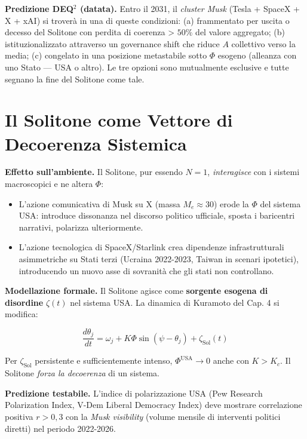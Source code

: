 \Conj{} \textbf{Predizione DEQ$^2$ (datata).} Entro il 2031, il
\emph{cluster Musk} (Tesla + SpaceX + X + xAI) si troverà in una di
queste condizioni: (a) frammentato per uscita o decesso del Solitone con
perdita di coerenza \textgreater{} \(50\%\) del valore aggregato; (b)
istituzionalizzato attraverso un governance shift che riduce \(A\)
collettivo verso la media; (c) congelato in una posizione metastabile
sotto \(\Phi\) esogeno (alleanza con uno Stato --- USA o altro). Le tre
opzioni sono mutualmente esclusive e tutte segnano la fine del Solitone
come tale.



\section{Il Solitone come Vettore di Decoerenza
Sistemica}\label{il-solitone-come-vettore-di-decoerenza-sistemica}

\Hypoth{} \textbf{Effetto sull'ambiente.} Il Solitone, pur essendo
\(N = 1\), \emph{interagisce} con i sistemi macroscopici e ne altera
\(\Phi\):

\begin{itemize}
\tightlist
\item
  L'azione comunicativa di Musk su X (massa \(M_e \approx 30\)) erode la
  \(\Phi\) del sistema USA: introduce dissonanza nel discorso politico
  ufficiale, sposta i baricentri narrativi, polarizza ulteriormente.
\item
  L'azione tecnologica di SpaceX/Starlink crea dipendenze
  infrastrutturali asimmetriche su Stati terzi (Ucraina 2022-2023,
  Taiwan in scenari ipotetici), introducendo un nuovo asse di sovranità
  che gli stati non controllano.
\end{itemize}

\Proved{} \textbf{Modellazione formale.} Il Solitone agisce come
\textbf{sorgente esogena di disordine} \(\zeta(t)\) nel sistema USA. La
dinamica di Kuramoto del Cap. 4 si modifica:

\[
\frac{d\theta_j}{dt} = \omega_j + K\Phi \sin(\psi - \theta_j) + \zeta_{\text{Sol}}(t)
\]

Per \(\zeta_{\text{Sol}}\) persistente e sufficientemente intenso,
\(\Phi^{\text{USA}} \to 0\) anche con \(K > K_c\). Il Solitone
\emph{forza la decoerenza} di un sistema.

\Conj{} \textbf{Predizione testabile.} L'indice di polarizzazione USA
(Pew Research Polarization Index, V-Dem Liberal Democracy Index) deve
mostrare correlazione positiva \(r > 0{,}3\) con la \emph{Musk
visibility} (volume mensile di interventi politici diretti) nel periodo
2022-2026.



